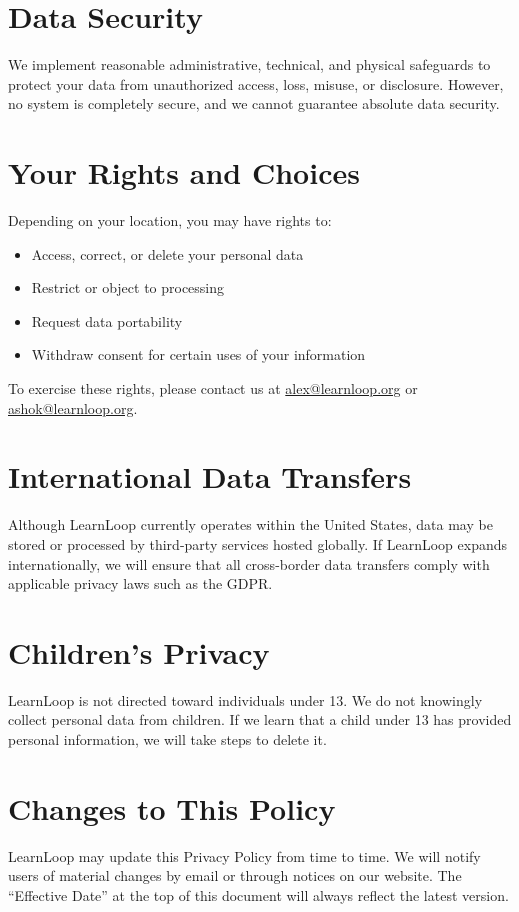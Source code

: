 \documentclass[12pt]{article}
\begin{document}
\section{Data Security}
We implement reasonable administrative, technical, and physical safeguards to protect your data from unauthorized access, loss, misuse, or disclosure. However, no system is completely secure, and we cannot guarantee absolute data security.

\section{Your Rights and Choices}
Depending on your location, you may have rights to:
\begin{itemize}[leftmargin=*]
    \item Access, correct, or delete your personal data
    \item Restrict or object to processing
    \item Request data portability
    \item Withdraw consent for certain uses of your information
\end{itemize}

To exercise these rights, please contact us at \href{mailto:alex@learnloop.org}{alex@learnloop.org} or \href{mailto:ashok@learnloop.org}{ashok@learnloop.org}.

\section{International Data Transfers}
Although LearnLoop currently operates within the United States, data may be stored or processed by third-party services hosted globally. If LearnLoop expands internationally, we will ensure that all cross-border data transfers comply with applicable privacy laws such as the GDPR.

\section{Children’s Privacy}
LearnLoop is not directed toward individuals under 13. We do not knowingly collect personal data from children. If we learn that a child under 13 has provided personal information, we will take steps to delete it.

\section{Changes to This Policy}
LearnLoop may update this Privacy Policy from time to time. We will notify users of material changes by email or through notices on our website. The “Effective Date” at the top of this document will always reflect the latest version.
\end{document}
